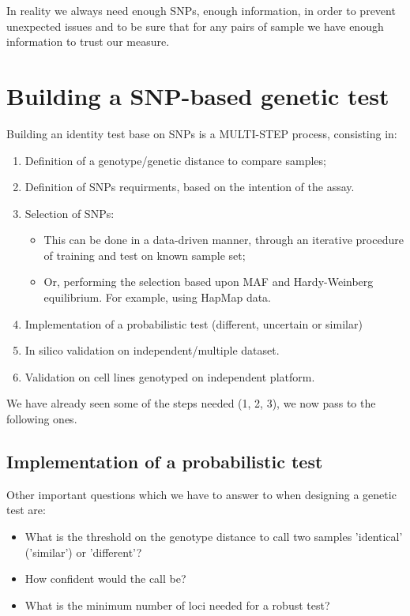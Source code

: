 In reality we always need enough SNPs, enough information, in order to prevent unexpected issues and to be sure that for any pairs of sample we have enough information to trust our measure.


\section{Building a SNP-based genetic test}

Building an identity test base on SNPs is a MULTI-STEP process, consisting in:
\begin{enumerate}
	\item Definition of a genotype/genetic distance to compare samples;
	\item Definition of SNPs requirments, based on the intention of the assay.
	\item Selection of SNPs:
	\begin{itemize}
		\item This can be done in a data-driven manner, through an iterative procedure of training and test on known sample set;
		\item Or, performing the selection based upon MAF and Hardy-Weinberg equilibrium. For example, using HapMap data.
	\end{itemize}
	\item Implementation of a probabilistic test (different, uncertain or similar)
	\item In silico validation on independent/multiple dataset.
	\item Validation on cell lines genotyped on independent platform.
\end{enumerate}
We have already seen some of the steps needed (1, 2, 3), we now pass to the following ones.


\subsection{Implementation of a probabilistic test}

Other important questions which we have to answer to when designing a genetic test are:
\begin{itemize}
	\item What is the threshold on the genotype distance to call two samples 'identical' ('similar') or 'different'?
	\item How confident would the call be?
    \item What is the minimum number of loci needed for a robust test?
\end{itemize}

